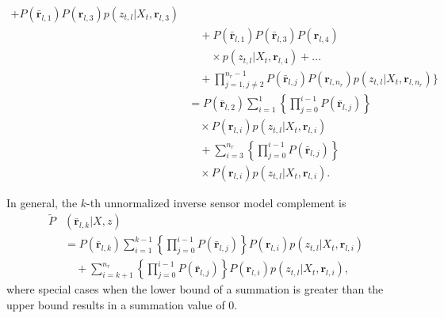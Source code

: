 \documentclass[letterpaper, 10pt, conference]{ieeeconf}
\begin{document}
\begin{appendix}
\begin{align}
+
P(\bar{\mathbf{r}}_{l,1})P(\mathbf{r}_{l,3})p(z_{t,l}|X_t,\mathbf{r}_{l,3})\nonumber\\&\quad
+P(\bar{\mathbf{r}}_{l,1})P(\bar{\mathbf{r}}_{l,3})P(\mathbf{r}_{l,4})\nonumber\\&\qquad\times p(z_{t,l}|X_t,\mathbf{r}_{l,4})+...\nonumber
\\
&\quad+\prod_{j=1,j\neq2}^{n_r-1}P(\bar{\mathbf{r}}_{l,j})P(\mathbf{r}_{l,n_r})p(z_{t,l}|X_t,\mathbf{r}_{l,n_r})
\bigg\}\nonumber
\\
&=
P(\bar{\mathbf{r}}_{l,2})\sum_{i=1}^{1}
\left\{
\prod_{j=0}^{i-1}P(\bar{\mathbf{r}}_{l,j})\right\}\nonumber\\&\quad\times P(\mathbf{r}_{l,i})p(z_{t,l}|X_t,\mathbf{r}_{l,i})\nonumber\\&\quad+\sum_{i=3}^{n_r}
\left\{
\prod_{j=0}^{i-1}P(\bar{\mathbf{r}}_{l,j})\right\}\nonumber\\&\quad\times P(\mathbf{r}_{l,i})p(z_{t,l}|X_t,\mathbf{r}_{l,i})
.
\end{align}



In general, the $k$-th unnormalized inverse sensor model complement is
\begin{align}
\label{eqn:ComplGenSol}
\tilde P&(\bar{\mathbf{r}}_{l,k}|X,z)\nonumber\\&=P(\bar{\mathbf{r}}_{l,k})\sum_{i=1}^{k-1}
\left\{
\prod_{j=0}^{i-1}P(\bar{\mathbf{r}}_{l,j})\right\}P(\mathbf{r}_{l,i})p(z_{t,l}|X_t,\mathbf{r}_{l,i})\nonumber\\&\quad
+\sum_{i=k+1}^{n_r}
\left\{
\prod_{j=0}^{i-1}P(\bar{\mathbf{r}}_{l,j})\right\}P(\mathbf{r}_{l,i})p(z_{t,l}|X_t,\mathbf{r}_{l,i})
,
\end{align}
where special cases when the lower bound of a summation is greater than the upper bound results in a summation value of $0$.


\end{appendix}
\end{document}
